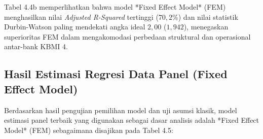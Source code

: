 \documentclass[12pt,a4paper]{article}
\numberwithin{equation}{section}
\begin{document}
\noindent
Tabel 4.4b memperlihatkan bahwa model *Fixed Effect Model* (FEM) menghasilkan nilai \emph{Adjusted R-Squared} tertinggi ($70{,}2\%$) dan nilai statistik Durbin-Watson paling mendekati angka ideal $2{,}00$ ($1{,}942$), menegaskan superioritas FEM dalam mengakomodasi perbedaan struktural dan operasional antar-bank KBMI 4.

\subsection{Hasil Estimasi Regresi Data Panel (Fixed Effect Model)}

\noindent
Berdasarkan hasil pengujian pemilihan model dan uji asumsi klasik, model estimasi panel terbaik yang digunakan sebagai dasar analisis adalah *Fixed Effect Model* (FEM) sebagaimana disajikan pada Tabel 4.5:
\end{document}
